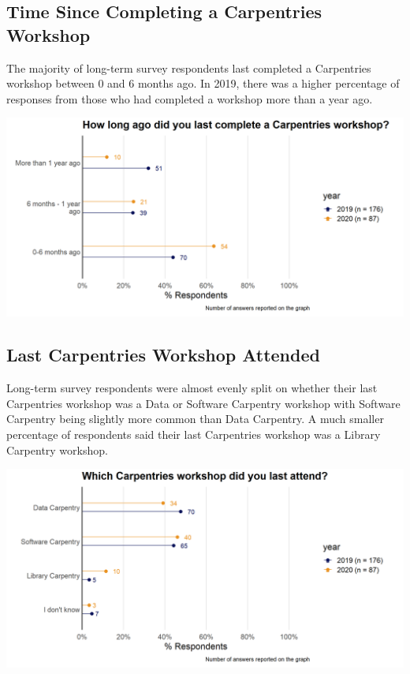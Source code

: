 \documentclass[
]{article}
\makeatletter
\def\maxwidth{\ifdim\Gin@nat@width>\linewidth\linewidth\else\Gin@nat@width\fi}
\makeatother
\begin{document}
\hypertarget{time-since-completing-a-carpentries-workshop}{%
\subsection{Time Since Completing a Carpentries
Workshop}\label{time-since-completing-a-carpentries-workshop}}

The majority of long-term survey respondents last completed a
Carpentries workshop between 0 and 6 months ago. In 2019, there was a
higher percentage of responses from those who had completed a workshop
more than a year ago.

\includegraphics[width=\maxwidth]{../figures/2020-12-longterm-workshop_attended_age-1}

\hypertarget{last-carpentries-workshop-attended}{%
\subsection{Last Carpentries Workshop
Attended}\label{last-carpentries-workshop-attended}}

Long-term survey respondents were almost evenly split on whether their
last Carpentries workshop was a Data or Software Carpentry workshop with
Software Carpentry being slightly more common than Data Carpentry. A
much smaller percentage of respondents said their last Carpentries
workshop was a Library Carpentry workshop.

\includegraphics[width=\maxwidth]{../figures/2020-12-longterm-workshop_attended_type-1}
\end{document}
